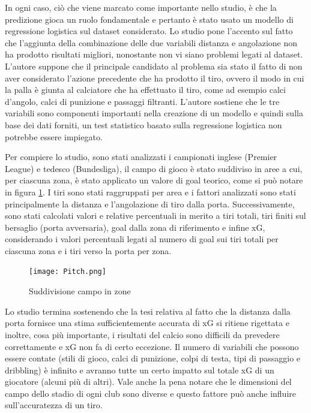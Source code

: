                 In ogni caso, ciò che viene marcato come importante nello studio, è che la predizione gioca un ruolo fondamentale e pertanto è stato usato un modello di regressione logistica sul dataset considerato. Lo studio pone l'accento sul fatto che l'aggiunta della combinazione delle due variabili distanza e angolazione non ha prodotto risultati migliori, nonostante non vi siano problemi legati al dataset. L'autore suppone che il principale candidato al problema sia stato il fatto di non aver considerato l'azione precedente che ha prodotto il tiro, ovvero il modo in cui la palla è giunta al calciatore che ha effettuato il tiro, come ad esempio calci d'angolo, calci di punizione e passaggi filtranti. L'autore sostiene che le tre variabili sono componenti importanti nella creazione di un modello e quindi sulla base dei dati forniti, un test statistico basato sulla regressione logistica non potrebbe essere impiegato. 
                
                Per compiere lo studio, sono stati analizzati i campionati inglese (Premier League) e tedesco (Bundesliga), il campo di gioco è stato suddiviso in aree a cui, per ciascuna zona, è stato applicato un valore di goal teorico, come si può notare in figura \ref{fig:Pitch}. I tiri sono stati raggruppati per area e i fattori analizzati sono stati principalmente la distanza e l'angolazione di tiro dalla porta. Successivamente, sono stati calcolati valori e relative percentuali in merito a tiri totali, tiri finiti sul bersaglio (porta avversaria), goal dalla zona di riferimento e infine xG, considerando i valori percentuali legati al numero di goal sui tiri totali per ciascuna zona e i tiri verso la porta per zona.

                \vspace{10pt}

                \begin{figure}[h]
                    \texttt{[image: Pitch.png]}
                    \centering
                    \caption{Suddivisione campo in zone}
                    \label{fig:Pitch}
                \end{figure}
                
                \vspace{10pt}
                
                Lo studio termina sostenendo che la tesi relativa al fatto che la distanza dalla porta fornisce una stima sufficientemente accurata di xG si ritiene rigettata e inoltre, cosa più importante, i risultati del calcio sono difficili da prevedere correttamente e xG non fa di certo eccezione. Il numero di variabili che possono essere contate (stili di gioco, calci di punizione, colpi di testa, tipi di passaggio e dribbling) è infinito e avranno tutte un certo impatto sul totale xG di un giocatore (alcuni più di altri). Vale anche la pena notare che le dimensioni del campo dello stadio di ogni club sono diverse e questo fattore può anche influire sull'accuratezza di un tiro.

